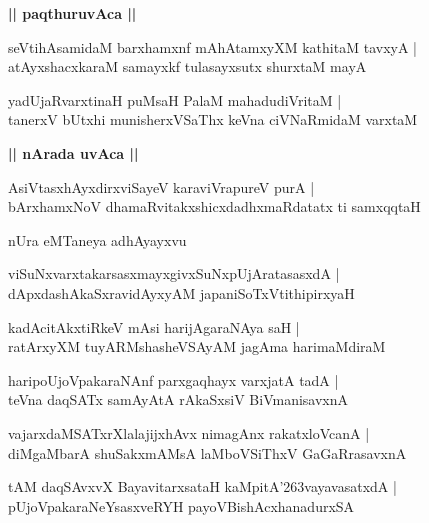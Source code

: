 \documentclass[twoside,12pt,openright]{book}
\def\S{\char'263}
\newcounter{shloka}[chapter]
\def\uvaca#1{\centerline{{\large\textbf{#1}}}}
\begin{document}
\uvaca{|| paqthuruvAca ||}

\begin{shloka}%
seVtihAsamidaM barxhamxnf mAhAtamxyXM kathitaM tavxyA |\\
atAyxshacxkaraM samayxkf tulasayxsutx shurxtaM mayA 
\end{shloka}

\begin{shloka}%
yadUjaRvarxtinaH puMsaH PalaM mahadudiVritaM |\\
tanerxV bUtxhi munisherxVSaThx keVna ciVNaRmidaM varxtaM 
\end{shloka}

\uvaca{|| nArada uvAca ||}

\begin{shloka}%
AsiVtasxhAyxdirxviSayeV karaviVrapureV purA |\\
bArxhamxNoV dhamaRvitakxshicxdadhxmaRdatatx ti samxqqtaH 
\end{shloka}

\begin{center}
nUra eMTaneya adhAyayxvu
\end{center}

\begin{shloka}%
viSuNxvarxtakarsasxmayxgivxSuNxpUjAratasasxdA |\\
dApxdashAkaSxravidAyxyAM japaniSoTxVtithipirxyaH 
\end{shloka}

\begin{shloka}%
kadAcitAkxtiRkeV mAsi harijAgaraNAya saH |\\
ratArxyXM tuyARMshasheVSAyAM jagAma harimaMdiraM 
\end{shloka}

\begin{shloka}%
haripoUjoVpakaraNAnf parxgaqhayx varxjatA tadA |\\
teVna daqSATx samAyAtA rAkaSxsiV BiVmanisavxnA 
\end{shloka}

\begin{shloka}%
vajarxdaMSATxrXlalajijxhAvx nimagAnx rakatxloVcanA |\\
diMgaMbarA shuSakxmAMsA laMboVSiThxV GaGaRrasavxnA 
\end{shloka}

\begin{shloka}%
tAM daqSAvxvX BayavitarxsataH kaMpitA\S vayavasatxdA |\\
pUjoVpakaraNeYsasxveRYH payoVBishAcxhanadurxSA 
\end{shloka}
\end{document}
